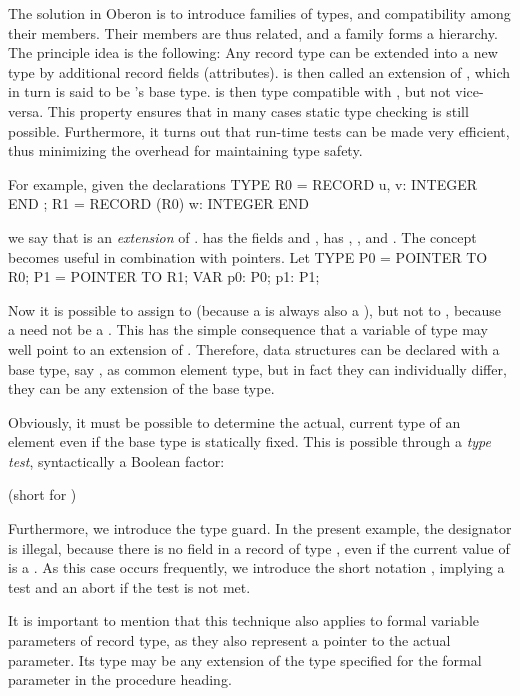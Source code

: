 The solution in Oberon is to introduce families of types, and compatibility among their members. Their members are thus related, and a family forms a hierarchy. The principle idea is the following: Any record type  can be extended into a new type  by additional record fields (attributes).  is then called an extension of , which in turn is said to be ’s base type.  is then type compatible with , but not vice-versa. This property ensures that in many cases static type checking is still possible. Furthermore, it turns out that run-time tests can be made very efficient, thus minimizing the overhead for maintaining type safety.

For example, given the declarations
\begintt
TYPE R0 = RECORD u, v: INTEGER END ;
     R1 = RECORD (R0) w: INTEGER END
\endtt

\noindent we say that  is an \emph{extension} of .  has the fields  and ,  has , , and . The concept becomes useful in combination with pointers. Let
\begintt
TYPE P0 = POINTER TO R0;
     P1 = POINTER TO R1;
VAR p0: P0; p1: P1;
\endtt

\noindent Now it is possible to assign  to  (because a  is always also a ), but not  to , because a  need not be a . This has the simple consequence that a variable of type  may well point to an extension of . Therefore, data structures can be declared with a base type, say , as common element type, but in fact they can individually differ, they can be any extension of the base type.

Obviously, it must be possible to determine the actual, current type of an element even if the base type is statically fixed. This is possible through a \emph{type test}, syntactically a Boolean factor:

 (short for )

Furthermore, we introduce the type guard. In the present example, the designator  is illegal, because there is no field  in a record of type , even if the current value of  is a . As this case occurs frequently, we introduce the short notation , implying a test  and an abort if the test is not met.

It is important to mention that this technique also applies to formal variable parameters of record type, as they also represent a pointer to the actual parameter. Its type may be any extension of the type specified for the formal parameter in the procedure heading.

